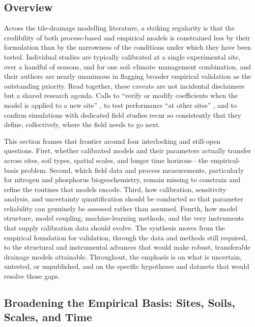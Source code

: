 \subsection{Overview}

Across the tile-drainage modelling literature, a striking regularity is that the credibility of both process-based and empirical models is constrained less by their formulation than by the narrowness of the conditions under which they have been tested. Individual studies are typically calibrated at a single experimental site, over a handful of seasons, and for one soil--climate--management combination, and their authors are nearly unanimous in flagging broader empirical validation as the outstanding priority. Read together, these caveats are not incidental disclaimers but a shared research agenda. Calls to ``verify or modify coefficients when the model is applied to a new site'' \parencite{Li2006}, to test performance ``at other sites'' \parencite{Qi2015}, and to confirm simulations with dedicated field studies \parencite{Shipitalo2016,Yousfi2014} recur so consistently that they define, collectively, where the field needs to go next.

This section frames that frontier around four interlocking and still-open questions. First, whether calibrated models and their parameters actually transfer across sites, soil types, spatial scales, and longer time horizons---the empirical-basis problem. Second, which field data and process measurements, particularly for nitrogen and phosphorus biogeochemistry, remain missing to constrain and refine the routines that models encode. Third, how calibration, sensitivity analysis, and uncertainty quantification should be conducted so that parameter reliability can genuinely be assessed rather than assumed. Fourth, how model structure, model coupling, machine-learning methods, and the very instruments that supply calibration data should evolve. The synthesis moves from the empirical foundation for validation, through the data and methods still required, to the structural and instrumental advances that would make robust, transferable drainage models attainable. Throughout, the emphasis is on what is uncertain, untested, or unpublished, and on the specific hypotheses and datasets that would resolve those gaps.

\subsection{Broadening the Empirical Basis: Sites, Soils, Scales, and Time}

